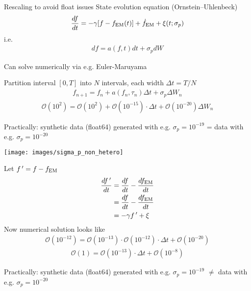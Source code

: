 \documentclass[10pt]{beamer}
\begin{document}
\begin{frame}{Rescaling to avoid float issues}
	State evolution equation (Ornstein–Uhlenbeck)
	\begin{eqnarray}
		\frac{df}{dt}= -\gamma [f - f_{\rm EM}(t)] + \dot{f}_{\rm EM} + \xi(t; \sigma_p)
	\end{eqnarray}
i.e. 
		\begin{eqnarray}
		df = a(f,t) dt + \sigma_p dW
	\end{eqnarray}

Can solve numerically via e.g. Euler-Maruyama

Partition interval $[0,T]$ into $N$ intervals, each width $\Delta t = T/N$ 
\begin{eqnarray}
	f_{n+1} = f_{n} + a(f_n, \tau_n) \Delta t + \sigma_p \Delta W_n
\end{eqnarray}
\begin{eqnarray}
		\mathcal{O}(10^2) = \mathcal{O}(10^2) + \mathcal{O}(10^{-15}) \cdot \Delta t  + \mathcal{O}(10^{-20}) \Delta W_n
\end{eqnarray}

Practically: synthetic data (float64) generated with e.g. $\sigma_p = 10^{-19}$ = data with e.g. $\sigma_p = 10^{-20}$ 

	
\end{frame}

\begin{frame}{}
	\texttt{[image: images/sigma\_p\_non\_hetero]}
	
	
\end{frame}


\begin{frame}{}
	Let $f \, ' = f - f_{\rm EM}$
	\begin{align}
		\frac{df \, '}{dt}&= \frac{df}{dt} - \frac{df_{\rm EM}}{dt} \\
		                    &= \frac{df}{dt} - \frac{df_{\rm EM}}{dt} \\
		                    &= - \gamma f \, '  + \xi 
	\end{align}
	Now numerical solution looks like
	\begin{eqnarray}
				\mathcal{O}(10^{-12}) = \mathcal{O}(10^{-13}) \cdot \mathcal{O}(10^{-12}) \cdot \Delta t  + \mathcal{O}(10^{-20})
	\end{eqnarray}
	\begin{eqnarray}
	\mathcal{O}(1) = \mathcal{O}(10^{-13}) \cdot \Delta t  + \mathcal{O}(10^{-8})
\end{eqnarray}


	
	Practically: synthetic data (float64) generated with e.g. $\sigma_p = 10^{-19}$ $\neq$ data with e.g. $\sigma_p = 10^{-20}$ 
	
	
\end{frame}
\end{document}
